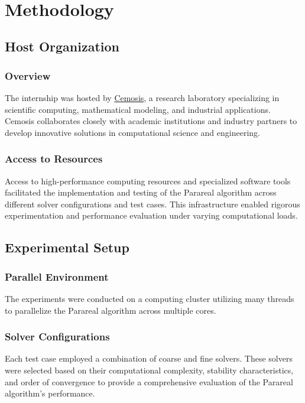 \documentclass[a4paper,12pt,french]{article}
\begin{document}


\
\section{Methodology}
\subsection{Host Organization}
\subsubsection{Overview}
The internship was hosted by \hyperlink{https://www.cemosis.fr/}{Cemosis}, a research laboratory specializing in scientific computing, mathematical modeling, and industrial applications. Cemosis collaborates closely with academic institutions and industry partners to develop innovative solutions in computational science and engineering.
\subsubsection{Access to Resources}
Access to high-performance computing resources and specialized software tools facilitated the implementation and testing of the Parareal algorithm across different solver configurations and test cases. This infrastructure enabled rigorous experimentation and performance evaluation under varying computational loads.
\subsection{Experimental Setup}
\subsubsection{Parallel Environment}
The experiments were conducted on a computing cluster utilizing many threads to parallelize the Parareal algorithm across multiple cores.

\subsubsection{Solver Configurations}
Each test case employed a combination of coarse and fine solvers. These solvers were selected based on their computational complexity, stability characteristics, and order of convergence to provide a comprehensive evaluation of the Parareal algorithm's performance.
\end{document}

